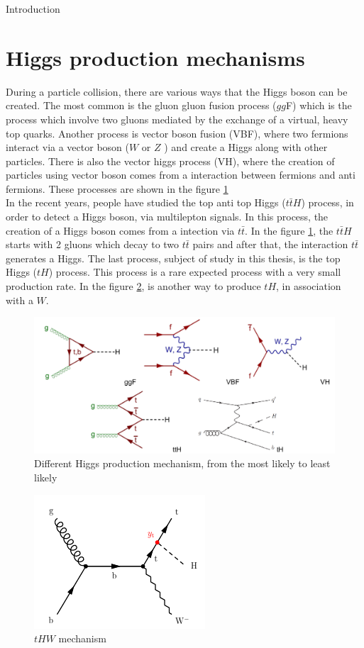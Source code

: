 \begin{chapter}{Introduction}
\pagebreak



\section{Higgs production mechanisms}
During a particle collision, there are various ways that the Higgs boson can be created. The most common is the gluon gluon fusion process ($gg$F) which is the process which involve two gluons mediated by the exchange of a virtual, heavy top
quarks. Another process is vector boson fusion (VBF), where two fermions interact via a vector boson ($W$ or $Z$ ) and create a Higgs along with other particles. There is also the vector higgs process (VH), where the creation of particles using vector boson comes from a interaction between fermions and anti fermions\cite{pd}. These processes are shown in the figure \ref{psu} \\

In the recent years, people have studied the top anti top Higgs ($t\bar{t}H$) process, in order to detect a Higgs boson, via multilepton signals\cite{th1}.
In this process, the creation of a Higgs boson comes from a intection via $t\bar{t}$. In the figure \ref{psu}, the $t\bar{t}H$ starts with 2 gluons which decay to two $t\bar{t}$ pairs and after that, the interaction $t\bar{t}$ generates a Higgs. The last process, subject of study in this thesis, is the top Higgs ($tH$) process. This process is a rare expected process with a very small production rate\cite{pd}. In the figure \ref{thw}, is another way to produce $tH$, in association with a $W$.

\begin{figure}[htbp]
\centering
\includegraphics[scale=0.5]{Chapter1/pg.png}
\caption{Different Higgs production mechanism, from the most likely to least likely}
\label{psu}
\end{figure}


\begin{figure}[htbp]
\centering
\includegraphics[scale=0.7]{Chapter1/thw.png}
\caption{$tHW$ mechanism}
\label{thw}
\end{figure}


\end{chapter}
